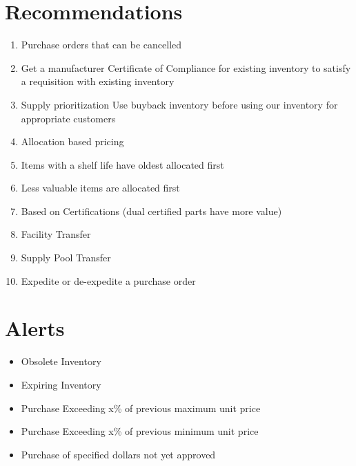 \documentclass[letterpaper,10pt,english]{sphinxmanual}
\begin{document}
\section{Recommendations}
\label{FutureState:recommendations}\begin{enumerate}
\item {} 
Purchase orders that can be cancelled

\item {} 
Get a manufacturer Certificate of Compliance for existing inventory
to satisfy a requisition with existing inventory

\item {} 
Supply prioritization Use buyback inventory before using our
inventory for appropriate customers

\item {} 
Allocation based pricing

\item {} 
Items with a shelf life have oldest allocated first

\item {} 
Less valuable items are allocated first

\item {} 
Based on Certifications (dual certified parts have more value)

\item {} 
Facility Transfer

\item {} 
Supply Pool Transfer

\item {} 
Expedite or de-expedite a purchase order

\end{enumerate}


\section{Alerts}
\label{FutureState:alerts}\begin{itemize}
\item {} 
Obsolete Inventory

\item {} 
Expiring Inventory

\item {} 
Purchase Exceeding x\% of previous maximum unit price

\item {} 
Purchase Exceeding x\% of previous minimum unit price

\item {} 
Purchase of specified dollars not yet approved

\end{itemize}
\end{document}
